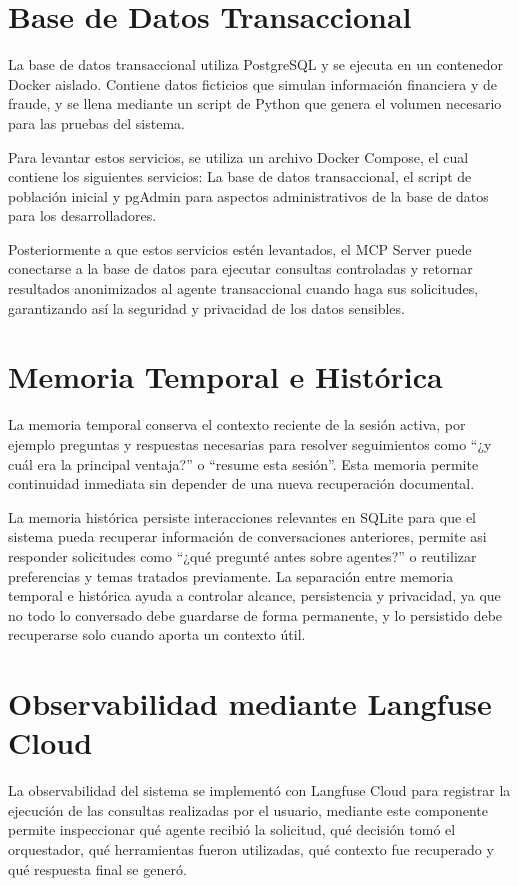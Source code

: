 \documentclass[conference]{IEEEtran}
\begin{document}
\section{Base de Datos Transaccional}
La base de datos transaccional utiliza PostgreSQL y se ejecuta en un contenedor Docker aislado. Contiene datos ficticios que simulan información financiera y de fraude, y se llena mediante un script de Python que genera el volumen necesario para las pruebas del sistema.

Para levantar estos servicios, se utiliza un archivo Docker Compose, el cual contiene los siguientes servicios: La base de datos transaccional, el script de población inicial y pgAdmin para aspectos administrativos de la base de datos para los desarrolladores.

Posteriormente a que estos servicios estén levantados, el MCP Server puede conectarse a la base de datos para ejecutar consultas controladas y retornar resultados anonimizados al agente transaccional cuando haga sus solicitudes, garantizando así la seguridad y privacidad de los datos sensibles.



\section{Memoria Temporal e Histórica}

La memoria temporal conserva el contexto reciente de la sesión activa, por ejemplo preguntas y respuestas necesarias para resolver seguimientos como ``¿y cuál era la principal ventaja?'' o ``resume esta sesión''. Esta memoria permite continuidad inmediata sin depender de una nueva recuperación documental.

La memoria histórica persiste interacciones relevantes en SQLite para que el sistema pueda recuperar información de conversaciones anteriores, permite asi responder solicitudes como ``¿qué pregunté antes sobre agentes?'' o reutilizar preferencias y temas tratados previamente. La separación entre memoria temporal e histórica ayuda a controlar alcance, persistencia y privacidad, ya que no todo lo conversado debe guardarse de forma permanente, y lo persistido debe recuperarse solo cuando aporta un contexto útil.

\section{Observabilidad mediante Langfuse Cloud}

La observabilidad del sistema se implementó con Langfuse Cloud para registrar la ejecución de las consultas realizadas por el usuario, mediante este componente permite inspeccionar qué agente recibió la solicitud, qué decisión tomó el orquestador, qué herramientas fueron utilizadas, qué contexto fue recuperado y qué respuesta final se generó.
\end{document}
